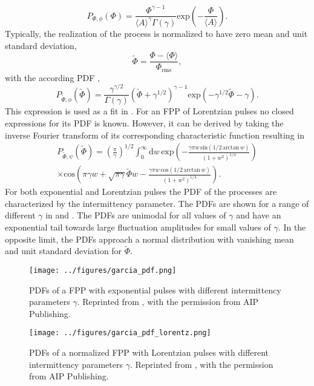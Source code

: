 \begin{equation}
	P_{\Phi,\phi}(\Phi) = \frac{\Phi^{\gamma-1}}{\langle A\rangle^\gamma \Gamma(\gamma)}\mathrm{exp}\left(-\frac{\Phi}{\langle A\rangle}\right).
\end{equation}
Typically, the realization of the process is normalized to have zero mean and unit standard deviation,
\begin{equation}\label{norm}
	\widetilde{\Phi} = \frac{\Phi - \langle\Phi\rangle}{\Phi_{\mathrm{rms}}},
\end{equation}
with the according PDF \cite{theodorsen2018probability},
\begin{equation}
	P_{\widetilde{\Phi},\phi}(\widetilde{\Phi}) = \frac{\gamma^{\gamma/2}}{\Gamma(\gamma)}\left(\widetilde{\Phi} + \gamma^{1/2} \right)^{\gamma-1}\mathrm{exp}\left(-\gamma^{1/2}\widetilde{\Phi} - \gamma\right).
\end{equation}
This expression is used as a fit in . For an FPP of Lorentzian pulses no closed expressions for its PDF is known. However, it can be derived by taking the inverse Fourier transform of its corresponding characteristic function resulting in \cite{garcia2018lorentz}
\begin{equation}
	\begin{split}
	P_{\widetilde{\Phi},\psi}(\widetilde{\Phi}) = \left(\frac{\pi}{\gamma}\right)^{1/2}\int_{0}^{\infty}\textrm{d}w\,\mathrm{exp}\left(-\frac{\gamma\pi w\, \mathrm{sin}\left(1/2\, \mathrm{arctan}\, w\right)}{(1+w^2)^{1/4}}\right)\\
	\times \mathrm{cos}\left(\pi\gamma w + \sqrt{\pi\gamma}\widetilde{\Phi}w-\frac{\gamma\pi w\, \mathrm{cos}\left(1/2\, \mathrm{arctan}\, w\right)}{(1+w^2)^{1/4}}\right).
	\end{split}
\end{equation}
For both exponential and Lorentzian pulses the PDF of the processes are characterized by the intermittency parameter. The PDFs are shown for a range of different $\gamma$ in  and . The PDFs are unimodal for all values of $\gamma$ and have an exponential tail towards large fluctuation amplitudes for small values of $\gamma$. In the opposite limit, the PDFs approach a normal distribution with vanishing mean and unit standard deviation for $\widetilde{\Phi}$.

\begin{figure}
	\centering
	\begin{minipage}{.48\linewidth}
		\texttt{[image: ../figures/garcia\_pdf.png]}
		\caption{PDFs of a FPP with exponential pulses with different intermittency parameters $\gamma$. Reprinted from \cite{garcia2016stochastic}, with the permission from AIP Publishing.}
		\label{Fig:garcia_pdf}
	\end{minipage}
	\hfill
	\begin{minipage}{.48\linewidth}
		\texttt{[image: ../figures/garcia\_pdf\_lorentz.png]}
		\caption{PDFs of a normalized FPP with Lorentzian pulses with different intermittency parameters $\gamma$. Reprinted from \cite{garcia2018lorentz}, with the permission from AIP Publishing.}
		\label{Fig:garcia_pdf_lorentz}
	\end{minipage}
\end{figure}
